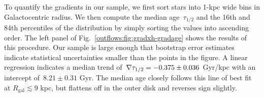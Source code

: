 
To quantify the gradients in our sample, we first sort stars into 1-kpc wide
bins in Galactocentric radius.
We then compute the median age~$\tau_{1/2}$ and the 16th and 84th percentiles
of the distribution by simply sorting the values into ascending order.
The left panel of Fig.~\ref{outflows:fig:gradxh-gradage} shows the results of
this procedure.
Our sample is large enough that bootstrap error estimates indicate statistical
uncertainties smaller than the points in the figure.
A linear regression indicates a median trend of~$\nabla\tau_{1/2} = -0.375 \pm 0.036$
Gyr/kpc with an intercept of~$8.21 \pm 0.31$ Gyr.
The median age closely follows this line of best fit at
$R_\text{gal} \lesssim 9$ kpc, but flattens off in the outer disk and reverses
sign slightly.

